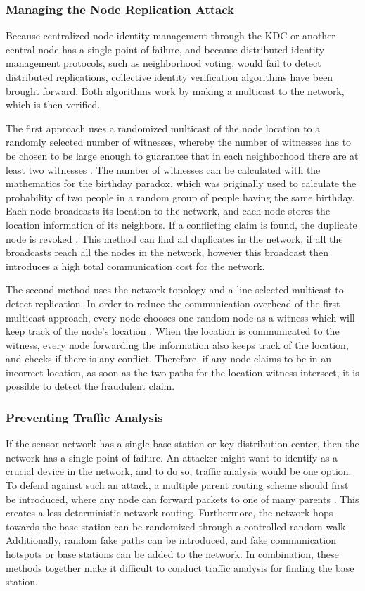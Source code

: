 \documentclass[12pt,a4paper,twoside]{report}
\begin{document}
\subsubsection{Managing the Node Replication Attack}
Because centralized node identity management through the KDC or another central node has a single point of failure, and because distributed identity management protocols, such as neighborhood voting, would fail to detect distributed replications, collective identity verification algorithms have been brought forward. Both algorithms work by making a multicast to the network, which is then verified.\par
The first approach uses a randomized multicast of the node location to a randomly selected number of witnesses, whereby the number of  witnesses has to be chosen to be large enough to guarantee that in each neighborhood there are at least two witnesses \cite{sen:2009}. The number of witnesses can be calculated with the mathematics for the birthday paradox, which was originally used to calculate the probability of two people in a random group of people having the same birthday. Each node broadcasts its location to the network, and each node stores the location information of its neighbors. If a conflicting claim is found, the duplicate node is revoked \cite{sen:2009}. This method can find all duplicates in the network, if all the broadcasts reach all the nodes in the network, however this broadcast then introduces a high total communication cost for the network.\par
The second method uses the network topology and a line-selected multicast to detect replication. In order to reduce the communication overhead of the first multicast approach, every node chooses one random node as a witness which will keep track of the node's location \cite{sen:2009}. When the location is communicated to the witness, every node forwarding the information also keeps track of the location, and checks if there is any conflict. Therefore, if any node claims to be in an incorrect location,  as soon as the two paths for the location witness intersect, it is possible to detect the fraudulent claim.\par
\subsubsection{Preventing Traffic Analysis}
If the sensor network has a single base station or key distribution center, then the network has a single point of failure. An attacker might want to identify as a crucial device in the network, and to do so, traffic analysis would be one option. To defend against such an attack, a multiple parent routing scheme should first be introduced, where any node can forward packets to one of many parents \cite{sen:2009}. This creates a less deterministic network routing. Furthermore, the network hops towards the base station can be randomized through a controlled random walk. Additionally, random fake paths can be introduced, and fake communication hotspots or base stations can be added to the network. In combination, these methods together make it difficult to conduct traffic analysis for finding the base station.\par
\end{document}
